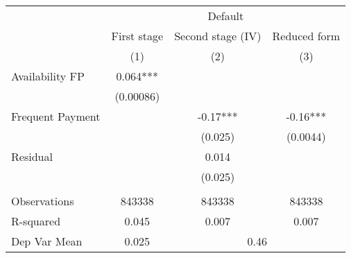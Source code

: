 \begin{tabular}{lccc}
\toprule
      & \multicolumn{3}{c}{Default} \\
\cmidrule{2-4}      & First stage & Second stage (IV) & Reduced form \\
\midrule
\midrule
      & (1)   & (2)   & (3) \\
\midrule
\midrule
Availability FP & 0.064*** &       &  \\
      & (0.00086) &       &  \\
Frequent Payment &       & -0.17*** & -0.16*** \\
      &       & (0.025) & (0.0044) \\
Residual &       & 0.014 &  \\
      &       & (0.025) &  \\
      &       &       &  \\
\midrule
Observations & 843338 & 843338 & 843338 \\
R-squared & 0.045 & 0.007 & 0.007 \\
Dep Var Mean & 0.025 & \multicolumn{2}{c}{0.46} \\
\bottomrule
\bottomrule
\end{tabular}%
